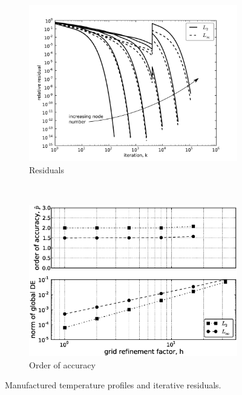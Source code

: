 \documentclass[11pt, letterpaper]{article}
\begin{document}
 
\begin{figure}
	\centering
	\begin{subfigure}[b]{0.475\textwidth}
		\centering
		\includegraphics[width=\textwidth]{./figs/MMS_resid.pdf}
		\caption{Residuals}
		\label{fig:MMS_resid}
	\end{subfigure}
	~
	\begin{subfigure}[b]{0.475\textwidth}
		\centering
		\includegraphics[width=\textwidth]{./figs/MMS_ooa.eps}
		\caption{Order of accuracy}
		\label{fig:MMS_ooa}
	\end{subfigure}
	\caption{Manufactured temperature profiles and iterative residuals.}
\end{figure}

\end{document}
